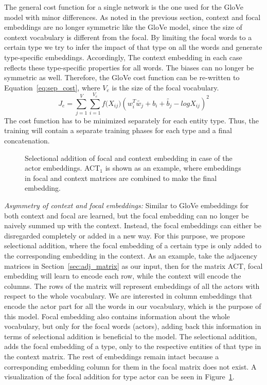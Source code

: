 The general cost function for a single network is the one used for the GloVe model with minor differences.
As noted in the previous section, context and focal embeddings are no longer symmetric like the GloVe model, since the size of context vocabulary is different from the focal. 
By limiting the focal words to a certain type we try to infer the impact of that type on all the words and generate type-specific embeddings. Accordingly, The context embedding in each case reflects these type-specific properties for all words. The biases can no longer be symmetric as well. Therefore, the GloVe cost function can be re-written to Equation~\ref{eq:sep_cost}, where $V_e$ is the size of the focal vocabulary.
\begin{equation}
J_e=\sum _{ j=1 }^{ V }{}\sum _{ i=1 }^{ V_e }{ f({ X }_{ ij } } )(w_{ i }^{ T }\tilde{  w_{ j } } +b_{ i }+\tilde{  b_{ j } } -log{ X }_{ ij })^2
\label{eq:sep_cost}
\end{equation}
The cost function has to be minimized separately for each entity type. Thus, the training will contain a separate training phases for each type and a final concatenation. \\

\begin{figure}
{\small 
{} %

}
\caption{Selectional addition of focal and context embedding in case of the actor embeddings. ACT$_1$ is shown as an example, where embeddings in focal and context matrices are combined to make the final embedding.} \label{fig:focal_addition}
\end{figure}
\noindent


\emph{Asymmetry of context and focal embeddings:} Similar to GloVe embeddings for both context and focal are learned, but the focal embedding can no longer be naively summed up with the context. Instead, the focal embeddings can either be disregarded completely or added in a new way. For this purpose, we propose selectional addition, where the focal embedding of a certain type is only added to the corresponding embedding in the context. As an example, take the adjacency matrices in Section~\ref{sec:adj_matrix} as our input, then for the matrix ACT,  focal embedding will learn to encode each row, while the context will encode the columns. The rows of the matrix will represent embeddings of all the actors with respect to the whole vocabulary. We are interested in column embeddings that encode the actor part for all the words in our vocabulary, which is the purpose of this model. Focal embedding also contains information about the whole vocabulary, but only for the focal words (actors), adding back this information in terms of selectional addition is beneficial to the model. The selectional addition, adds the focal embedding of a type, only to the respective entities of that type in the context matrix. The rest of embeddings remain intact because a corresponding embedding column for them in the focal matrix does not exist. A visualization of the focal addition for type actor can be seen in Figure~\ref{fig:focal_addition}.\\

